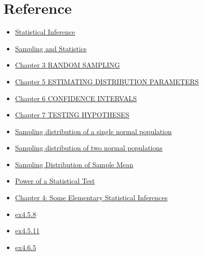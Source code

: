 \section{Reference}
\begin{itemize}
    \item \href{https://byjus.com/maths/statistical-inference/}{Statistical Inference}
    \item \href{https://faculty.etsu.edu/gardnerr/4047/notes-Hogg-McKean-Craig/Hogg-McKean-Craig-4-1.pdf}{Sampling and Statistics}
    \item \href{https://spartan.ac.brocku.ca/~jvrbik/MATH2P82/Statistics.PDF}{Chapter 3 RANDOM SAMPLING}
    \item \href{https://spartan.ac.brocku.ca/~jvrbik/MATH2P82/Statistics.PDF}{Chapter 5 ESTIMATING DISTRIBUTION PARAMETERS}
    \item \href{https://spartan.ac.brocku.ca/~jvrbik/MATH2P82/Statistics.PDF}{Chapter 6 CONFIDENCE INTERVALS}
    \item \href{https://spartan.ac.brocku.ca/~jvrbik/MATH2P82/Statistics.PDF}{Chapter 7 TESTING HYPOTHESES}
    \item \href{https://cloud.moezx.cc/Document/mooc/%E6%B5%99%E5%A4%A7%E6%A6%82%E7%8E%87%E8%AE%BA/%E7%AC%AC42%E8%AE%B2%20.pdf}{Sampling distribution of a single normal population}
    \item \href{https://cloud.moezx.cc/Document/mooc/%E6%B5%99%E5%A4%A7%E6%A6%82%E7%8E%87%E8%AE%BA/%E7%AC%AC43%E8%AE%B2%20.pdf}{Sampling distribution of two normal populations}
    \item \href{https://online.stat.psu.edu/stat414/lesson/26/26.2}{Sampling Distribution of Sample Mean}
    \item \href{https://online.stat.psu.edu/stat415/lesson/25}{Power of a Statistical Test}
    \item \href{https://www.stat.purdue.edu/~tlzhang/stat517/chapter4_517.pdf}{Chapter 4: Some Elementary Statistical Inferences}
    \item \href{https://tomoki-okuno.com/files/math/Ch4_sol.pdf}{ex4.5.8}
    \item \href{https://tomoki-okuno.com/files/math/Ch4_sol.pdf}{ex4.5.11}
    \item \href{https://zhuanlan.zhihu.com/p/570096188}{ex4.6.5}
\end{itemize}